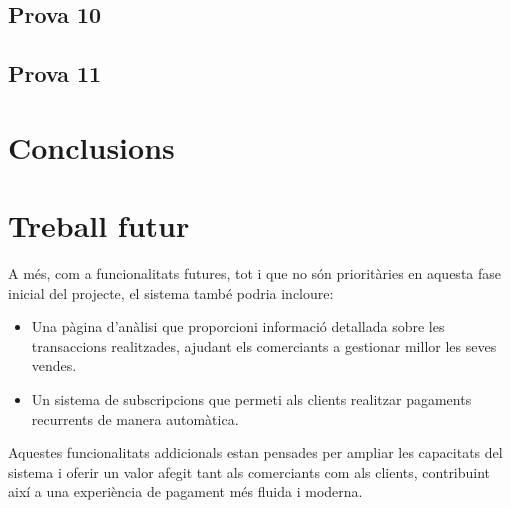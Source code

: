 \documentclass[a4paper,12pt,twoside]{ThesisStyle}
\begin{document}
\section{Prova 10}
\section{Prova 11}



\chapter{Conclusions}
\label{chp:conclusions}



\chapter{Treball futur}
\label{chp:treballfutur}

A més, com a funcionalitats futures, tot i que no són prioritàries en aquesta fase inicial del projecte, el sistema també podria incloure:

\begin{itemize}
  \item Una pàgina d'anàlisi que proporcioni informació detallada sobre les transaccions realitzades, ajudant els comerciants a gestionar millor les seves vendes.
  \item Un sistema de subscripcions que permeti als clients realitzar pagaments recurrents de manera automàtica.
\end{itemize}

Aquestes funcionalitats addicionals estan pensades per ampliar les capacitats del sistema i oferir un valor afegit tant als comerciants com als clients, contribuint així a una experiència de pagament més fluida i moderna.







\end{document}
